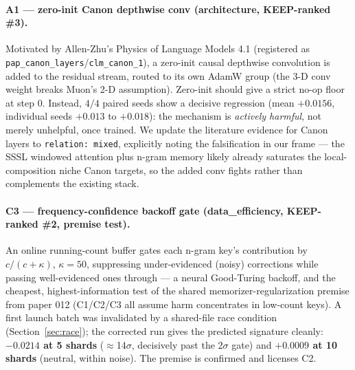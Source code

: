 \documentclass{article}
\begin{document}
\paragraph{A1 --- zero-init Canon depthwise conv (architecture, KEEP-ranked \#3).} Motivated by Allen-Zhu's Physics of Language Models 4.1 (registered as \texttt{pap\_canon\_layers}/\texttt{clm\_canon\_1}), a zero-init causal depthwise convolution is added to the residual stream, routed to its own AdamW group (the 3-D conv weight breaks Muon's 2-D assumption). Zero-init should give a strict no-op floor at step 0. Instead, $4/4$ paired seeds show a decisive regression (mean $+0.0156$, individual seeds $+0.013$ to $+0.018$): the mechanism is \emph{actively harmful}, not merely unhelpful, once trained. We update the literature evidence for Canon layers to \texttt{relation: mixed}, explicitly noting the falsification in our frame --- the SSSL windowed attention plus n-gram memory likely already saturates the local-composition niche Canon targets, so the added conv fights rather than complements the existing stack.

\paragraph{C3 --- frequency-confidence backoff gate (data\_efficiency, KEEP-ranked \#2, premise test).} An online running-count buffer gates each n-gram key's contribution by $c/(c+\kappa)$, $\kappa=50$, suppressing under-evidenced (noisy) corrections while passing well-evidenced ones through --- a neural Good-Turing backoff, and the cheapest, highest-information test of the shared memorizer-regularization premise from paper 012 (C1/C2/C3 all assume harm concentrates in low-count keys). A first launch batch was invalidated by a shared-file race condition (Section~\ref{sec:race}); the corrected run gives the predicted signature cleanly: \textbf{$-0.0214$ at 5 shards} ($\approx$14$\sigma$, decisively past the 2$\sigma$ gate) and \textbf{$+0.0009$ at 10 shards} (neutral, within noise). The premise is confirmed and licenses C2.
\end{document}
